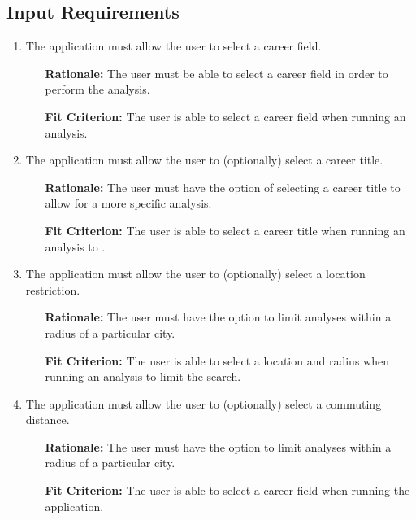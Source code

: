 \documentclass[english]{article}
\begin{document}
\subsection{Input Requirements}
\begin{enumerate}[\bf{FIR}1.]
	\item The application must allow the user to select a career field.
	\begin{enumerate}[leftmargin=1cm]
        \item [{\bf Rationale:}] The user must be able to select a career field in order to perform the analysis.
        \item [{\bf Fit Criterion:}] The user is able to select a career field when running an analysis.
	\end{enumerate}

    \item The application must allow the user to (optionally) select a career title.
	\begin{enumerate}[leftmargin=1cm]
        \item [{\bf Rationale:}] The user must have the option of selecting a career title to allow for a more specific analysis.
        \item [{\bf Fit Criterion:}] The user is able to select a career title when running an analysis to .
	\end{enumerate}

    \item The application must allow the user to (optionally) select a location restriction.
	\begin{enumerate}[leftmargin=1cm]
        \item [{\bf Rationale:}] The user must have the option to limit analyses within a radius of a particular city.
        \item [{\bf Fit Criterion:}] The user is able to select a location and radius when running an analysis to limit the search.
	\end{enumerate}

    \item The application must allow the user to (optionally) select a commuting distance.
	\begin{enumerate}[leftmargin=1cm]
        \item [{\bf Rationale:}] The user must have the option to limit analyses within a radius of a particular city.
        \item [{\bf Fit Criterion:}] The user is able to select a career field when running the application.
	\end{enumerate}


\end{enumerate}
\end{document}
